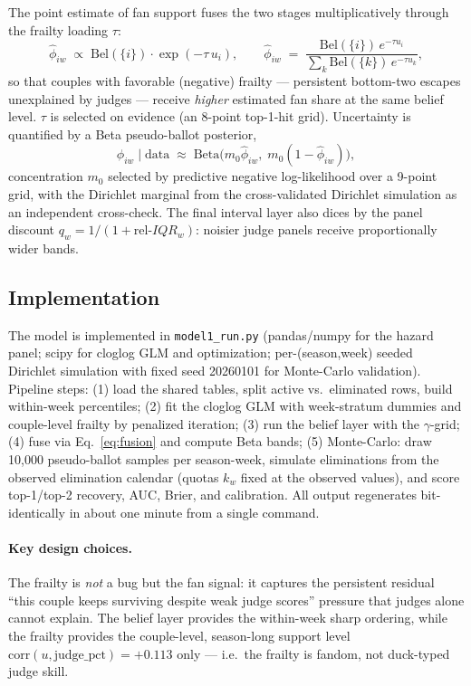 \documentclass[10pt]{article}
\begin{document}
The point estimate of fan support fuses the two stages multiplicatively through the
frailty loading $\tau$:
\begin{equation}
\hat\phi_{iw} \;\propto\; \mathrm{Bel}(\{i\})\cdot\exp(-\tau\,u_i),
\qquad \hat\phi_{iw} \;=\; \frac{\mathrm{Bel}(\{i\})\,e^{-\tau u_i}}
{\sum_k \mathrm{Bel}(\{k\})\,e^{-\tau u_k}},
\label{eq:fusion}
\end{equation}
so that couples with favorable (negative) frailty --- persistent bottom-two escapes
unexplained by judges --- receive \emph{higher} estimated fan share at the same belief
level. $\tau$ is selected on evidence (an 8-point top-1-hit grid). Uncertainty is
quantified by a Beta pseudo-ballot posterior,
\begin{equation}
\phi_{iw} \mid \text{data} \;\approx\; \mathrm{Beta}\!\big(m_0\hat\phi_{iw},\;
m_0(1-\hat\phi_{iw})\big),
\end{equation}
concentration $m_0$ selected by predictive negative log-likelihood over a 9-point grid,
with the Dirichlet marginal from the cross-validated Dirichlet simulation as an
independent cross-check. The final interval layer also dices by the panel discount
$q_w = 1/(1+\mathrm{rel}\text{-}IQR_w)$: noisier judge panels receive proportionally
wider bands.

\subsection{Implementation}

The model is implemented in \texttt{model1\_run.py} (pandas/numpy for the hazard panel;
scipy for cloglog GLM and optimization; per-(season,week) seeded Dirichlet simulation with
fixed seed 20260101 for Monte-Carlo validation). Pipeline steps: (1) load the shared
tables, split active vs.\ eliminated rows, build within-week percentiles; (2) fit the
cloglog GLM with week-stratum dummies and couple-level frailty by penalized iteration;
(3) run the belief layer with the $\gamma$-grid; (4) fuse via Eq.~\eqref{eq:fusion} and
compute Beta bands; (5) Monte-Carlo: draw 10{,}000 pseudo-ballot samples per season-week,
simulate eliminations from the observed elimination calendar (quotas $k_w$ fixed at the
observed values), and score top-1/top-2 recovery, AUC, Brier, and calibration. All output
regenerates bit-identically in about one minute from a single command.

\paragraph{Key design choices.} The frailty is \emph{not} a bug but the fan signal: it
captures the persistent residual ``this couple keeps surviving despite weak judge scores''
pressure that judges alone cannot explain. The belief layer provides the within-week sharp
ordering, while the frailty provides the couple-level, season-long support level
$\mathrm{corr}(u, \text{judge\_pct}) = +0.113$ only --- i.e.\ the frailty is fandom, not
duck-typed judge skill.
\end{document}
